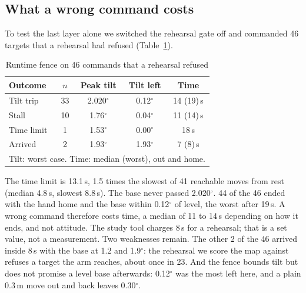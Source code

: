 \documentclass[conference]{IEEEtran}
\begin{document}
\subsection{What a wrong command costs}\label{sec:fence}
To test the last layer alone we switched the rehearsal gate off and commanded 46 targets that a rehearsal
had refused (Table~\ref{tab:fence}).
\begin{table}[t]
\caption{Runtime fence on 46 commands that a rehearsal refused}\label{tab:fence}
\centering\begin{tabular}{lcccc}\toprule
Outcome & $n$ & Peak tilt & Tilt left & Time\\\midrule
Tilt trip & 33 & 2.020$^\circ$ & 0.12$^\circ$ & 14 (19)\,s\\
Stall & 10 & 1.76$^\circ$ & 0.04$^\circ$ & 11 (14)\,s\\
Time limit & 1 & 1.53$^\circ$ & 0.00$^\circ$ & 18\,s\\
Arrived & 2 & 1.93$^\circ$ & 1.93$^\circ$ & 7 (8)\,s\\\bottomrule
\multicolumn{5}{l}{\footnotesize Tilt: worst case. Time: median (worst), out and home.}
\end{tabular}\end{table}
The time limit is 13.1\,s, 1.5 times the slowest of 41 reachable moves from rest (median 4.8\,s, slowest
8.8\,s). The base never passed 2.020$^\circ$. 44 of the 46 ended with the hand home and the base within
0.12$^\circ$ of level, the worst after 19\,s. A wrong command therefore costs time, a median of 11 to 14\,s
depending on how it ends, and not attitude. The study tool charges 8\,s for a rehearsal; that is a set value, not a measurement.
Two weaknesses remain. The other 2 of the 46 arrived inside 8\,s with the base at 1.2 and 1.9$^\circ$: the
rehearsal we score the map against refuses a target the arm reaches, about once in 23. And the fence bounds
tilt but does not promise a level base afterwards: 0.12$^\circ$ was the most left here, and a plain 0.3\,m
move out and back leaves 0.30$^\circ$.
\end{document}
